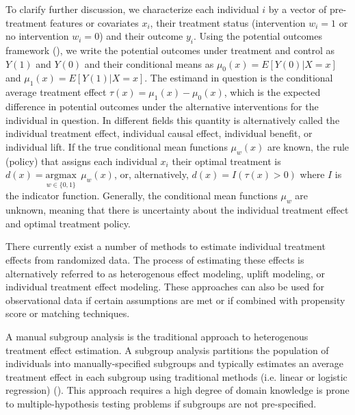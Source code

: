 To clarify further discussion, we characterize each individual $i$ by a vector of pre-treatment features or covariates $x_i$, their treatment status (intervention $w_i=1$ or no intervention $w_i=0$) and their outcome $y_i$. Using the potential outcomes framework (\citealp{Rubin2005}), we write the potential outcomes under treatment and control as $Y(1)$ and $Y(0)$ and their conditional means as $\mu_0(x) = E[Y(0)|X=x]$ and $\mu_1(x) = E[Y(1)|X=x]$. The estimand in question is the conditional average treatment effect $\tau(x) = \mu_1(x) - \mu_0(x)$, which is the expected difference in potential outcomes under the alternative interventions for the individual in question. In different fields this quantity is alternatively called the individual treatment effect, individual causal effect, individual benefit, or individual lift. If the true conditional mean functions $\mu_w(x)$ are known, the rule (policy) that assigns each individual $x_i$ their optimal treatment is $d(x) = \underset{w \in \{0,1\}}{\text{argmax}} \ \ \mu_w(x)$, or, alternatively, $d(x) = I(\tau(x) > 0)$ where $I$ is the indicator function. Generally, the conditional mean functions $\mu_w$ are unknown, meaning that there is uncertainty about the individual treatment effect and optimal treatment policy.

There currently exist a number of methods to estimate individual treatment effects from randomized data. The process of estimating these effects is alternatively referred to as heterogenous effect modeling, uplift modeling, or individual treatment effect modeling. These approaches can also be used for observational data if certain assumptions are met or if combined with propensity score or matching techniques.

A manual subgroup analysis is the traditional approach to heterogenous treatment effect estimation. A subgroup analysis partitions the population of individuals into manually-specified subgroups and typically estimates an average treatment effect in each subgroup using traditional methods (i.e. linear or logistic regression) (\citealp{Gail:1985ft}). This approach requires a high degree of domain knowledge is prone to multiple-hypothesis testing problems if subgroups are not pre-specified. 

